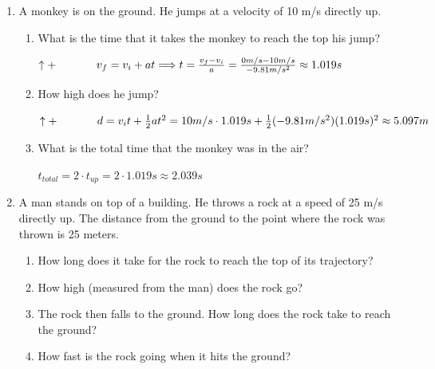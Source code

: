 \documentclass[letterpaper, 12pt]{article}
\begin{document}
\begin{enumerate}
	
	
	\item A monkey is on the ground.  He jumps at a velocity of 10 m/s directly up.  
		\begin{enumerate}
		\vspace{-.1in} \item What is the time that it takes the monkey to reach the top his jump?
			
			\color{red}
			\begin{center}
				\hspace{-1in} $\uparrow+ \hspace{0.5in}  v_f = v_i + a t \Longrightarrow t = \frac{v_f-v_i}{a} = \frac{0m/s - 10m/s}{-9.81m/s^2} \approx 1.019 s 
				$
			\end{center}
			\color{black}
			
		
		
		
		\item How high does he jump?

				
			\color{red}
			\begin{center}
				\hspace{-1in} $\uparrow+ \hspace{0.5in}  d = v_i t + \frac{1}{2}at^2 = 10 m/s \cdot 1.019s+ \frac{1}{2}(-9.81m/s^2)(1.019s)^2 \approx 5.097m
				$
			\end{center}
			\color{black}

		\item What is the total time that the monkey was in the air?
					
	\color{red}
	\begin{center}
	$t_{total} = 2 \cdot t_{up}  = 	2 \cdot 1.019s \approx 2.039 s	$
	\end{center}
	\color{black}
	




	\end{enumerate}
	\vspace{-.1in} \item A man stands on top of a building.  He throws a rock at a speed of 25 m/s directly up.  The distance from the ground to the point where the rock was thrown is 25 meters.
	\begin{enumerate}
		\item How long does it take for the rock to reach the top of its trajectory?
		\vspace{0.4in}
		\item How high (measured from the man) does the rock go?
		\vspace{0.4in}
		\item The rock then falls to the ground.  How long does the rock take to reach the ground?
		\vspace{0.4in}
		\item How fast is the rock going when it hits the ground?
			\vspace{0.4in}
	\end{enumerate}


\end{enumerate}
\end{document}
